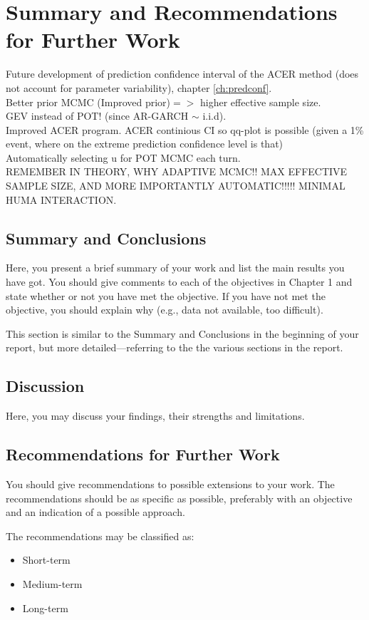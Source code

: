 \chapter[Summary]{Summary and Recommendations for Further Work}
Future development of prediction confidence interval of the ACER method (does not account for parameter variability), chapter \ref{ch:predconf}.\\%
Better prior MCMC (Improved prior)$=>$ higher effective sample size.\\
GEV instead of POT! (since AR-GARCH $\sim$ i.i.d).\\
Improved ACER program. ACER continious CI so qq-plot is possible (given a 1\% event, where on the extreme prediction confidence level is that)\\
Automatically selecting u for POT MCMC each turn.\\
REMEMBER IN THEORY, WHY ADAPTIVE MCMC!! MAX EFFECTIVE SAMPLE SIZE, AND MORE IMPORTANTLY AUTOMATIC!!!!! MINIMAL HUMA INTERACTION.\\


\section{Summary and Conclusions}
Here, you present a brief summary of your work and list the main results you have got. You should give comments to each of the objectives in Chapter 1 and state whether or not you have met the objective. If you have not met the objective, you should explain why (e.g., data not available, too difficult).

This section is similar to the Summary and Conclusions in the beginning of your report, but more detailed---referring to the the various sections in the report.

\section{Discussion}
Here, you may discuss your findings, their strengths and limitations.
\section{Recommendations for Further Work}
You should give recommendations to possible extensions to your work. The recommendations should be as specific as possible, preferably with an objective and an indication of a possible approach.

The recommendations may be classified as:
\begin{itemize}
\item Short-term
\item Medium-term
\item Long-term
\end{itemize}